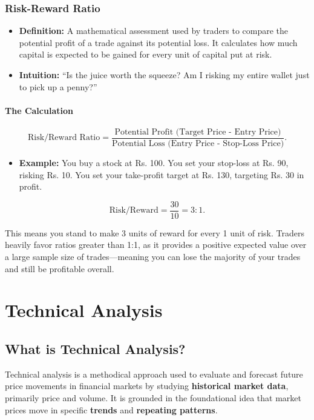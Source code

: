 \documentclass[12pt,openany]{book}
\begin{document}
\subsubsection{Risk-Reward Ratio}

\begin{itemize}[leftmargin=*]
    \item \textbf{Definition:} A mathematical assessment used by traders to compare the potential profit of a trade against its potential loss. It calculates how much capital is expected to be gained for every unit of capital put at risk.
    \item \textbf{Intuition:} ``Is the juice worth the squeeze? Am I risking my entire wallet just to pick up a penny?''
\end{itemize}

\paragraph{The Calculation}
\begin{equation*}
    \text{Risk/Reward Ratio} =
    \frac{\text{Potential Profit (Target Price - Entry Price)}}{\text{Potential Loss (Entry Price - Stop-Loss Price)}}.
\end{equation*}

\begin{itemize}[leftmargin=*]
    \item \textbf{Example:} You buy a stock at Rs. 100. You set your stop-loss at Rs. 90, risking Rs. 10. You set your take-profit target at Rs. 130, targeting Rs. 30 in profit.
\end{itemize}

\begin{equation*}
    \text{Risk/Reward} = \frac{30}{10} = 3{:}1.
\end{equation*}

This means you stand to make 3 units of reward for every 1 unit of risk. Traders heavily favor ratios greater than 1:1, as it provides a positive expected value over a large sample size of trades---meaning you can lose the majority of your trades and still be profitable overall.


\section{Technical Analysis}

\subsection{What is Technical Analysis?}
Technical analysis is a methodical approach used to evaluate and forecast future price movements in financial markets by studying \textbf{historical market data}, primarily price and volume. It is grounded in the foundational idea that market prices move in specific \textbf{trends} and \textbf{repeating patterns}.
\end{document}
